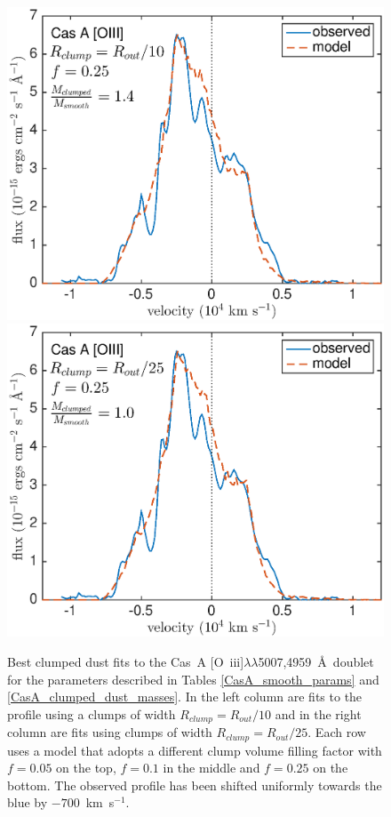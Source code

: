 \begin{figure}
\vspace{6mm}
\includegraphics[scale=0.43,clip=true, trim=30 0 50 20]{chapters/chapter6/figs/CasA/clumped/CasA_OIII_c10_f0_25}
\includegraphics[scale=0.43,clip=true, trim=30 0 40 20]{chapters/chapter6/figs/CasA/clumped/CasA_OIII_c25_f0_25}

\caption{Best clumped dust fits to the Cas~A [O~{\sc iii}]$\lambda\lambda$5007,4959~\AA\ doublet for the parameters described in Tables \ref{CasA_smooth_params} and \ref{CasA_clumped_dust_masses}.  In the left column are fits to the profile using a clumps of width $R_{clump}=R_{out}/10$ and in the right column are fits using clumps of width $R_{clump}=R_{out}/25$.  Each row uses a model that adopts a different clump volume filling factor with $f=0.05$ on the top, $f=0.1$ in the middle and $f=0.25$ on the bottom.  The observed profile has been shifted uniformly towards the blue by $-700$~km~s$^{-1}$.}
\label{CasA_OIII_clumped}
\end{figure}

